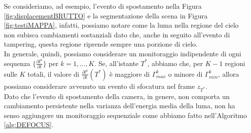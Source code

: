 Se consideriamo, ad  esempio, l'evento di spostamento nella Figura \ref{fig:displacementBRUTTO} e la segmentazione della scena in Figura \ref{fig:testiMAPPA}, infatti, possiamo notare come la luma nella regione del cielo non subisca cambiamenti sostanziali dato che, anche in seguito all'evento di tampering, questa regione riprende sempre una porzione di cielo.\\
In generale, quindi, possiamo considerare un monitoraggio indipendente di ogni sequenza $\{\frac{\partial l^k}{\partial t}\}$ per $k=1,\dots,K$.
Se, all'istante $T^*$, abbiamo che, per $K-1$ regioni sulle $K$ totali, il valore di $\frac{\partial l^k}{\partial t}(T^*)$ \`e maggiore di $\Gamma_{max}^k$ o minore di $\Gamma_{min}^k$, allora possiamo considerare avvenuto un evento di sfocatura nel frame $z_{T^*}$. \\ 
Dato che l'evento di spostamento della camera, in genere, non comporta un cambiamento persistente nella varianza dell'energia media della luma, non ha senso aggiungere un monitoraggio sequenziale come abbiamo fatto nell'Algoritmo \ref{alg:DEFOCUS}.

